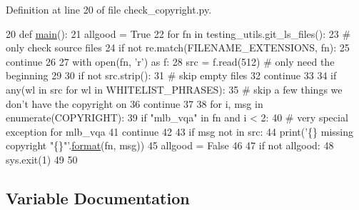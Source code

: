 Definition at line 20 of file check\+\_\+copyright.\+py.


\begin{DoxyCode}
20 \textcolor{keyword}{def }\hyperlink{namespacetests_1_1check__copyright_a9fcf3c755e0bf8e93320f2f09bd7ce04}{main}():
21     allgood = \textcolor{keyword}{True}
22     \textcolor{keywordflow}{for} fn \textcolor{keywordflow}{in} testing\_utils.git\_ls\_files():
23         \textcolor{comment}{# only check source files}
24         \textcolor{keywordflow}{if} \textcolor{keywordflow}{not} re.match(FILENAME\_EXTENSIONS, fn):
25             \textcolor{keywordflow}{continue}
26 
27         with open(fn, \textcolor{stringliteral}{'r') as f:}
28 \textcolor{stringliteral}{            src = f.read(512)  }\textcolor{comment}{# only need the beginning}
29 
30         \textcolor{keywordflow}{if} \textcolor{keywordflow}{not} src.strip():
31             \textcolor{comment}{# skip empty files}
32             \textcolor{keywordflow}{continue}
33 
34         \textcolor{keywordflow}{if} any(wl \textcolor{keywordflow}{in} src \textcolor{keywordflow}{for} wl \textcolor{keywordflow}{in} WHITELIST\_PHRASES):
35             \textcolor{comment}{# skip a few things we don't have the copyright on}
36             \textcolor{keywordflow}{continue}
37 
38         \textcolor{keywordflow}{for} i, msg \textcolor{keywordflow}{in} enumerate(COPYRIGHT):
39             \textcolor{keywordflow}{if} \textcolor{stringliteral}{"mlb\_vqa"} \textcolor{keywordflow}{in} fn \textcolor{keywordflow}{and} i < 2:
40                 \textcolor{comment}{# very special exception for mlb\_vqa}
41                 \textcolor{keywordflow}{continue}
42 
43             \textcolor{keywordflow}{if} msg \textcolor{keywordflow}{not} \textcolor{keywordflow}{in} src:
44                 print(\textcolor{stringliteral}{'\{\} missing copyright "\{\}"'}.\hyperlink{namespaceparlai_1_1chat__service_1_1services_1_1messenger_1_1shared__utils_a32e2e2022b824fbaf80c747160b52a76}{format}(fn, msg))
45                 allgood = \textcolor{keyword}{False}
46 
47     \textcolor{keywordflow}{if} \textcolor{keywordflow}{not} allgood:
48         sys.exit(1)
49 
50 
\end{DoxyCode}


\subsection{Variable Documentation}
\mbox{\label{namespacetests_1_1check__copyright_a2aae78d9a278ab846941cce2c4c4c469}} 

